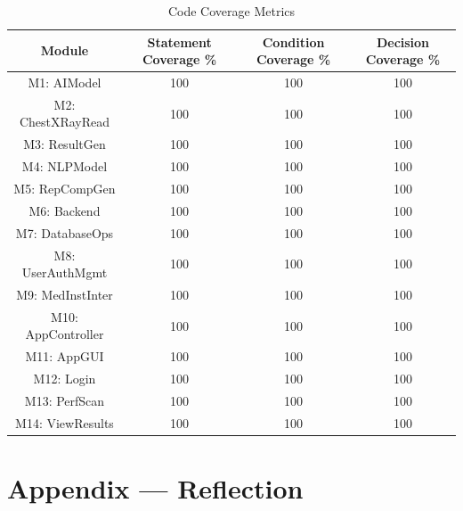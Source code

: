 \documentclass[12pt, titlepage]{article}
\begin{document}
\begin{table}[H]
    \centering
    \label{tab:CodeCovMetrics}
    \hspace*{-2cm}
    \begin{tabular}{|c|c|c|c|}
        \hline
        Module & Statement Coverage \% & Condition Coverage \% & Decision Coverage \% \\
        \hline
        M1: AIModel & 100 & 100 & 100 \\
        \hline
        M2: ChestXRayRead & 100 & 100 & 100 \\
        \hline
        M3: ResultGen & 100 & 100 & 100 \\
        \hline
        M4: NLPModel & 100 & 100 & 100 \\
        \hline
        M5: RepCompGen & 100 & 100 & 100 \\
        \hline
        M6: Backend & 100 & 100 & 100 \\
        \hline
        M7: DatabaseOps & 100 & 100 & 100 \\
        \hline
        M8: UserAuthMgmt & 100 & 100 & 100 \\
        \hline
        M9: MedInstInter & 100 & 100 & 100 \\
        \hline
        M10: AppController & 100 & 100 & 100 \\
        \hline
        M11: AppGUI & 100 & 100 & 100 \\
        \hline
        M12: Login & 100 & 100 & 100 \\
        \hline
        M13: PerfScan & 100 & 100 & 100 \\
        \hline
        M14: ViewResults & 100 & 100 & 100 \\
        \hline
    \end{tabular}
    \caption{Code Coverage Metrics}
\end{table}

% 
% 

\newpage{}
\section*{Appendix --- Reflection}


\end{document}
